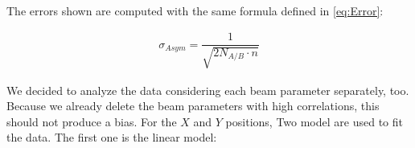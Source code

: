 \begin{figure}[hbtp]
\centering
{}
\\
\end{figure}

The errors shown are computed with the same formula defined in \ref{eq:Error}:

\begin{align*}
\sigma_{Asym} = \dfrac{1}{\sqrt{2N_{A/B} \cdot n}}
\end{align*}

We decided to analyze the data considering each beam parameter separately, too. Because we already delete the beam parameters with high correlations, this should not produce a bias. For the $X$ and $Y$ positions, Two model are used to fit the data. The first one is the linear model: 

